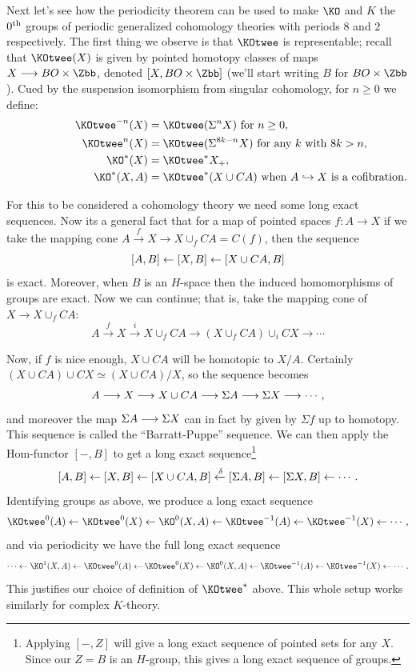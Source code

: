 Next let's see how the periodicity theorem can be used to make $\KO$ and $K$ the $0^\textup{th}$ groups of periodic generalized cohomology theories with periods $8$ and $2$ respectively.  The first thing we observe is that $\KOtwee$ is representable; recall that $\KOtwee(X)$ is given by pointed homotopy classes of maps $X \to BO \times \Zbb$, denoted $[X, BO \times \Zbb]$ (we'll start writing $B$ for $BO \times \Zbb$).  Cued by the suspension isomorphism from singular cohomology, for $n \ge 0$ we define:
\begin{align*}
\qquad\qquad\qquad
\KOtwee^{-n} (X) & = \KOtwee(\Suspend^n X)\hbox{\ for $n\geq0$}, \\
\KOtwee^n(X) & = \KOtwee(\Suspend^{8k-n}X) \hbox{\ for any $k$ with $8k > n$}, \\
\KO^*(X) &= \KOtwee^* X_+, \\
\KO^*(X, A) & = \KOtwee^*(X \cup CA) \textup{\ when $A\hookrightarrow X$ is a cofibration.}
\end{align*}

For this to be considered a cohomology theory we need some long exact sequences.  Now its a general fact that for a map of pointed spaces $f: A \to X$ if we take the mapping cone $A \xrightarrow{f} X \to X \cup_f CA = C(f)$, then the sequence
\[
[A, B] \leftarrow [X, B] \leftarrow [X \cup CA, B]
\]
is exact.  Moreover, when $B$ is an $H$-space then the induced homomorphisms of groups are exact.  Now we can continue; that is, take the mapping cone of $X \to X \cup_f CA$:
\[
A \xrightarrow{f} X \xrightarrow{i} X \cup_f CA \to (X \cup_f CA) \cup_i CX \to \cdots
\]

Now, if $f$ is nice enough, $X \cup CA$ will be homotopic to $X / A$.  Certainly $(X \cup CA) \cup CX \simeq (X \cup CA)/X$, so the sequence becomes
\[
A \longrightarrow X \longrightarrow X \cup CA \longrightarrow \Sigma A \longrightarrow \Sigma X \longrightarrow \cdots
,\]
and moreover the map $\Sigma A \longrightarrow \Sigma X$ can in fact by given by $\Sigma f$ up to homotopy.  This sequence is called the ``Barratt-Puppe'' sequence.  We can then apply the Hom-functor $[-, B]$ to get a long exact sequence\footnote{Applying $[-, Z]$ will give a long exact sequence of pointed sets for any $X$.  Since our $Z = B$ is an $H$-group, this gives a long exact sequence of groups.}
\[
[A, B] \leftarrow [X, B] \leftarrow [X \cup CA, B] \xleftarrow{\delta} [\Sigma A, B] \leftarrow [\Sigma X, B] \leftarrow \cdots
.\]
Identifying groups as above, we produce a long exact sequence
\[
\KOtwee^0 (A) \from \KOtwee^0(X) \from \KO^0(X, A) \from \KOtwee^{-1}(A) \from \KOtwee^{-1}(X) \from \cdots
,\]
and via periodicity we have the full long exact sequence
\[
\cdots \from \KO^1(X, A) \from \KOtwee^0 (A) \from \KOtwee^0(X) \from \KO^0(X, A) \from \KOtwee^{-1}(A) \from \KOtwee^{-1}(X) \from \cdots
.\]
This justifies our choice of definition of $\KOtwee^*$ above.  This whole setup works similarly for complex $K$-theory.

